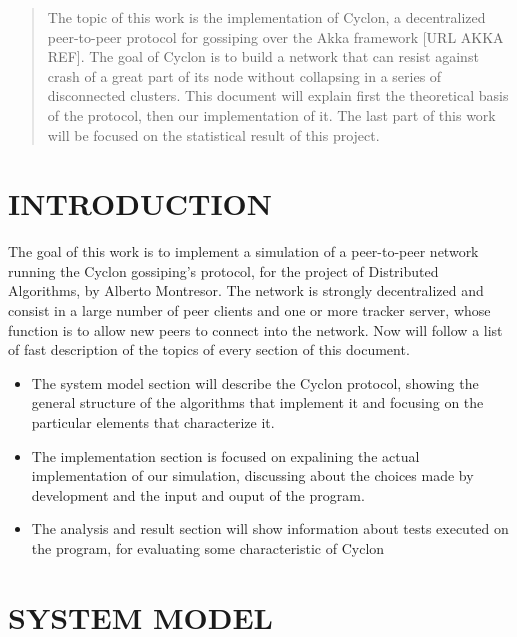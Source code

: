 \documentclass[a4paper,12pt,notitlepage]{article} %
\begin{document}

\begin{abstract}
   	 	
    The topic of this work is the implementation of Cyclon, a decentralized
    peer-to-peer protocol for gossiping over the Akka framework [URL AKKA REF].
    The goal of Cyclon is to build a network that can resist against crash of 
    a great part of its node without  collapsing in a series of disconnected clusters.
    This document will explain first the theoretical basis of the protocol, then 
    our implementation of it. The last part of this work will be focused on the statistical
    result of this project.
  

\end{abstract}
\newpage



\section{INTRODUCTION}

The goal of this work is to implement a simulation of a peer-to-peer network running
 the Cyclon gossiping's protocol, for the project of Distributed Algorithms, by Alberto Montresor. 
 The network is strongly decentralized and consist in a 
 large number of peer clients and one or more tracker server, whose function is to allow new 
 peers to connect into the network. Now will follow a list of fast description of the topics of every
 section of this document.

 \begin{itemize}
 	\item The system model section will describe the Cyclon protocol, showing  the general structure of 
 	the algorithms that implement it and focusing on the particular elements that characterize it.
 	\item The implementation section is focused on expalining the actual implementation of 
 	our simulation, discussing about the choices made by development and the input and
 	 ouput of the program.
 	\item The analysis and result section will show information about tests executed on 
 	the program, for evaluating some characteristic of Cyclon
 \end{itemize}



\section{SYSTEM MODEL}
\end{document}
